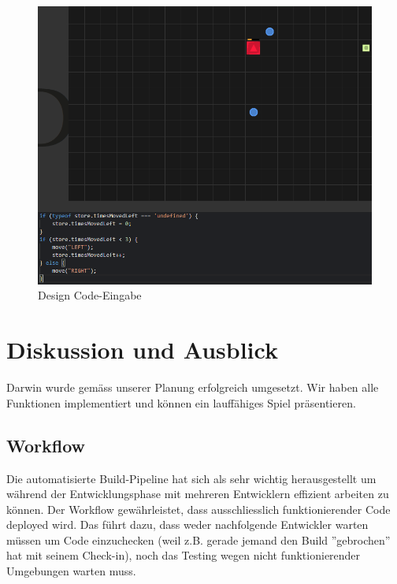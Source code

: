 \documentclass[11pt,a4paper,titlepage]{article}
\begin{document}
\begin{figure}[H]
	\centering
	\includegraphics[width=\textwidth]{game2.png}
	\caption{Design Code-Eingabe}
	\label{code-eingabe}
\end{figure}

\newpage

\section{Diskussion und Ausblick}
%

Darwin wurde gemäss unserer Planung erfolgreich umgesetzt. Wir haben alle Funktionen implementiert und können ein lauffähiges Spiel präsentieren.

\subsection{Workflow}

Die automatisierte Build-Pipeline hat sich als sehr wichtig herausgestellt um während der Entwicklungsphase mit mehreren Entwicklern effizient arbeiten zu können. Der Workflow gewährleistet, dass ausschliesslich funktionierender Code deployed wird. Das führt dazu, dass weder nachfolgende Entwickler warten müssen um Code einzuchecken (weil z.B. gerade jemand den Build ''gebrochen'' hat mit seinem Check-in), noch das Testing wegen nicht funktionierender Umgebungen warten muss.
\end{document}
